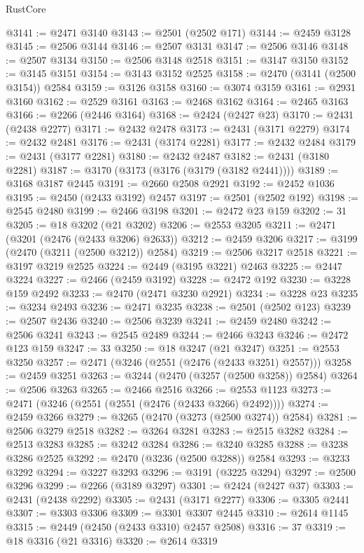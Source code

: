 \begin{lexlean}{RustCore}
\begin{coremodule}
@3141 := @2471 @3140
@3143 := @2501 (@2502 @171)
@3144 := @2459 @3128
@3145 := @2506 @3144
@3146 := @2507 @3131
@3147 := @2506 @3146
@3148 := @2507 @3134
@3150 := @2506 @3148 @2518
@3151 := @3147 @3150
@3152 := @3145 @3151
@3154 := @3143 @3152 @2525
@3158 := @2470 (@3141 (@2500 @3154)) @2584
@3159 := @3126 @3158
@3160 := @3074 @3159
@3161 := @2931 @3160
@3162 := @2529 @3161
@3163 := @2468 @3162
@3164 := @2465 @3163
@3166 := @2266 (@2446 @3164)
@3168 := @2424 (@2427 @23)
@3170 := @2431 (@2438 @2277)
@3171 := @2432 @2478
@3173 := @2431 (@3171 @2279)
@3174 := @2432 @2481
@3176 := @2431 (@3174 @2281)
@3177 := @2432 @2484
@3179 := @2431 (@3177 @2281)
@3180 := @2432 @2487
@3182 := @2431 (@3180 @2281)
@3187 := @3170 (@3173 (@3176 (@3179 (@3182 @2441))))
@3189 := @3168 @3187 @2445
@3191 := @2660 @2508 @2921
@3192 := @2452 @1036
@3195 := @2450 (@2433 @3192) @2457
@3197 := @2501 (@2502 @192)
@3198 := @2545 @2480
@3199 := @2466 @3198
@3201 := @2472 @23 @159
@3202 := 31
@3205 := @18 @3202 (@21 @3202)
@3206 := @2553 @3205
@3211 := @2471 (@3201 (@2476 (@2433 @3206) @2633))
@3212 := @2459 @3206
@3217 := @3199 (@2470 (@3211 (@2500 @3212)) @2584)
@3219 := @2506 @3217 @2518
@3221 := @3197 @3219 @2525
@3224 := @2449 (@3195 @3221) @2463
@3225 := @2447 @3224
@3227 := @2466 (@2459 @3192)
@3228 := @2472 @192
@3230 := @3228 @159 @2492
@3233 := @2470 (@2471 @3230 @2921)
@3234 := @3228 @23
@3235 := @3234 @2493
@3236 := @2471 @3235
@3238 := @2501 (@2502 @123)
@3239 := @2507 @2436
@3240 := @2506 @3239
@3241 := @2459 @2480
@3242 := @2506 @3241
@3243 := @2545 @2489
@3244 := @2466 @3243
@3246 := @2472 @123 @159
@3247 := 33
@3250 := @18 @3247 (@21 @3247)
@3251 := @2553 @3250
@3257 := @2471 (@3246 (@2551 (@2476 (@2433 @3251) @2557)))
@3258 := @2459 @3251
@3263 := @3244 (@2470 (@3257 (@2500 @3258)) @2584)
@3264 := @2506 @3263
@3265 := @2466 @2516
@3266 := @2553 @1123
@3273 := @2471 (@3246 (@2551 (@2551 (@2476 (@2433 @3266) @2492))))
@3274 := @2459 @3266
@3279 := @3265 (@2470 (@3273 (@2500 @3274)) @2584)
@3281 := @2506 @3279 @2518
@3282 := @3264 @3281
@3283 := @2515 @3282
@3284 := @2513 @3283
@3285 := @3242 @3284
@3286 := @3240 @3285
@3288 := @3238 @3286 @2525
@3292 := @2470 (@3236 (@2500 @3288)) @2584
@3293 := @3233 @3292
@3294 := @3227 @3293
@3296 := @3191 (@3225 @3294)
@3297 := @2500 @3296
@3299 := @2266 (@3189 @3297)
@3301 := @2424 (@2427 @37)
@3303 := @2431 (@2438 @2292)
@3305 := @2431 (@3171 @2277)
@3306 := @3305 @2441
@3307 := @3303 @3306
@3309 := @3301 @3307 @2445
@3310 := @2614 @1145
@3315 := @2449 (@2450 (@2433 @3310) @2457 @2508)
@3316 := 37
@3319 := @18 @3316 (@21 @3316)
@3320 := @2614 @3319

\end{coremodule}
\end{lexlean}
